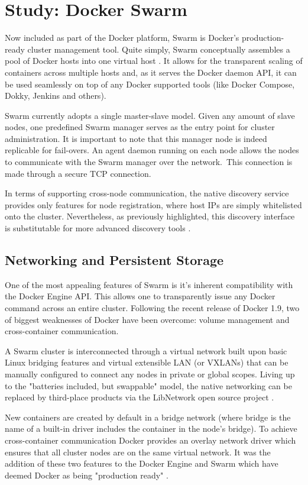 \documentclass{article}
\begin{document}
\section{Study: Docker Swarm}
Now included as part of the Docker platform, Swarm is Docker's production-ready cluster management tool.  Quite simply, Swarm conceptually assembles a pool of Docker hosts into one virtual host \citep{swarm_manual}. It allows for the transparent scaling of containers across multiple hosts and, as it serves the Docker daemon API, it can be used seamlessly on top of any Docker supported tools (like Docker Compose, Dokky, Jenkins and others).
\par
Swarm currently adopts a single master-slave model. Given any amount of slave nodes, one predefined Swarm manager serves as the entry point for cluster administration. It is important to note that this manager node is indeed replicable for fail-overs.
An agent daemon running on each node allows the nodes to communicate with the Swarm manager over the network.\ This connection is made through a secure TCP connection. 
\par
In terms of supporting cross-node communication, the native discovery service provides only features for node registration, where host IPs are simply whitelisted onto the cluster. Nevertheless, as previously highlighted, this discovery interface is substitutable for more advanced discovery tools \citep{holla}. 

\subsection{Networking and Persistent Storage}
One of the most appealing features of Swarm is it's inherent compatibility with the Docker Engine API. This allows one to transparently issue any Docker command across an entire cluster. Following the recent release of Docker 1.9, two of biggest weaknesses of Docker have been overcome: volume management and cross-container communication.
\par
A Swarm cluster is interconnected through a virtual network built upon basic Linux bridging features and virtual extensible LAN (or VXLANs) that can be manually configured to connect any nodes in private or global scopes. Living up to the "batteries included, but swappable" model, the native networking can be replaced by third-place products via the LibNetwork open source project \citep{Butler}.
\par
New containers are created by default in a bridge network (where bridge is the name of a built-in driver includes the container in the node's bridge). To achieve cross-container communication Docker provides an overlay network driver which ensures that all cluster nodes are on the same virtual network. It was the addition of these two features to the Docker Engine and Swarm which have deemed Docker as being "production ready" \citep{milestone}.
\end{document}
